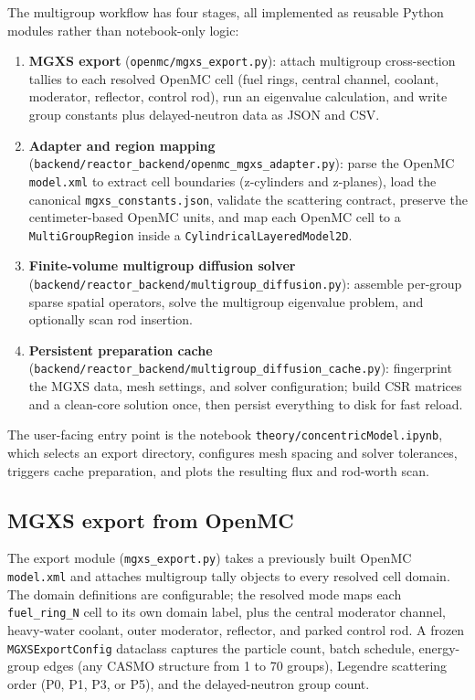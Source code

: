 \documentclass[11pt]{article}
\begin{document}
The multigroup workflow has four stages, all implemented as reusable Python
modules rather than notebook-only logic:

\begin{enumerate}
  \item \textbf{MGXS export} (\texttt{openmc/mgxs\_export.py}):
        attach multigroup cross-section tallies to each resolved OpenMC cell
        (fuel rings, central channel, coolant, moderator, reflector, control
        rod), run an eigenvalue calculation, and write group constants plus
        delayed-neutron data as JSON and CSV.
  \item \textbf{Adapter and region mapping}
        (\texttt{backend/reactor\_backend/openmc\_mgxs\_adapter.py}):
        parse the OpenMC \texttt{model.xml} to extract cell boundaries
        (z-cylinders and z-planes), load the canonical
        \texttt{mgxs\_constants.json}, validate the scattering contract,
        preserve the centimeter-based OpenMC units, and map each OpenMC cell to a
        \texttt{MultiGroupRegion} inside a \texttt{CylindricalLayeredModel2D}.
  \item \textbf{Finite-volume multigroup diffusion solver}
        (\texttt{backend/reactor\_backend/multigroup\_diffusion.py}):
        assemble per-group sparse spatial operators, solve the multigroup
        eigenvalue problem, and optionally scan rod insertion.
  \item \textbf{Persistent preparation cache}
        (\texttt{backend/reactor\_backend/multigroup\_diffusion\_cache.py}):
        fingerprint the MGXS data, mesh settings, and solver configuration;
        build CSR matrices and a clean-core solution once, then persist
        everything to disk for fast reload.
\end{enumerate}

The user-facing entry point is the notebook
\texttt{theory/concentricModel.ipynb}, which selects an export directory,
configures mesh spacing and solver tolerances, triggers cache preparation, and
plots the resulting flux and rod-worth scan.

\subsection{MGXS export from OpenMC}

The export module (\texttt{mgxs\_export.py}) takes a previously built OpenMC
\texttt{model.xml} and attaches multigroup tally objects to every resolved
cell domain.  The domain definitions are configurable; the resolved mode maps
each \texttt{fuel\_ring\_N} cell to its own domain label, plus the central
moderator channel, heavy-water coolant, outer moderator, reflector, and
parked control rod.  A frozen \texttt{MGXSExportConfig} dataclass captures the
particle count, batch schedule, energy-group edges (any CASMO structure from
1 to 70 groups), Legendre scattering order (P0, P1, P3, or P5), and the
delayed-neutron group count.
\end{document}
